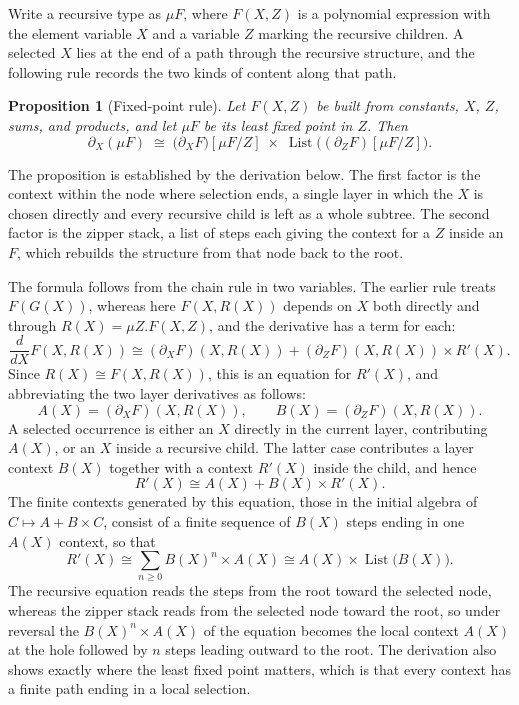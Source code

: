 \documentclass[11pt]{article}
\newtheorem{proposition}{Proposition}
\begin{document}
Write a recursive type as $\mu F$, where $F(X,Z)$ is a polynomial expression with the element variable $X$ and a variable $Z$ marking the recursive children. A selected $X$ lies at the end of a path through the recursive structure, and the following rule records the two kinds of content along that path.

\begin{proposition}[Fixed-point rule]
Let $F(X,Z)$ be built from constants, $X$, $Z$, sums, and products, and let $\mu F$ be its least fixed point in $Z$. Then
\[
\partial_X(\mu F)\;\cong\;
\bigl(\partial_X F\bigr)[\mu F/Z]\;\times\;\operatorname{List}\bigl((\partial_Z F)[\mu F/Z]\bigr).
\]
\end{proposition}

The proposition is established by the derivation below. The first factor is the context within the node where selection ends, a single layer in which the $X$ is chosen directly and every recursive child is left as a whole subtree. The second factor is the zipper stack, a list of steps each giving the context for a $Z$ inside an $F$, which rebuilds the structure from that node back to the root.

The formula follows from the chain rule in two variables. The earlier rule treats $F(G(X))$, whereas here $F(X,R(X))$ depends on $X$ both directly and through $R(X)=\mu Z.F(X,Z)$, and the derivative has a term for each:
\[
\frac{d}{dX}F(X,R(X))
\cong
(\partial_X F)(X,R(X))
+
(\partial_Z F)(X,R(X))\times R'(X).
\]
Since $R(X)\cong F(X,R(X))$, this is an equation for $R'(X)$, and abbreviating the two layer derivatives as follows:
\[
A(X)=(\partial_X F)(X,R(X)),
\qquad
B(X)=(\partial_Z F)(X,R(X)).
\]
A selected occurrence is either an $X$ directly in the current layer, contributing $A(X)$, or an $X$ inside a recursive child. The latter case contributes a layer context $B(X)$ together with a context $R'(X)$ inside the child, and hence
\[
R'(X)\cong A(X)+B(X)\times R'(X).
\]
The finite contexts generated by this equation, those in the initial algebra of $C\mapsto A+B\times C$, consist of a finite sequence of $B(X)$ steps ending in one $A(X)$ context, so that
\[
R'(X)\cong\sum_{n\ge 0}B(X)^n\times A(X)\cong A(X)\times\operatorname{List}\bigl(B(X)\bigr).
\]
The recursive equation reads the steps from the root toward the selected node, whereas the zipper stack reads from the selected node toward the root, so under reversal the $B(X)^n\times A(X)$ of the equation becomes the local context $A(X)$ at the hole followed by $n$ steps leading outward to the root. The derivation also shows exactly where the least fixed point matters, which is that every context has a finite path ending in a local selection.
\end{document}
